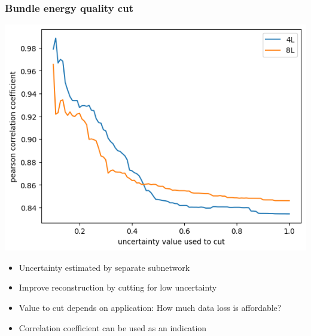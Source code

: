 \documentclass[aspectratio=1610, 9pt]{beamer}
\begin{document}
\begin{frame}
  \frametitle{Bundle energy quality cut}
  \includegraphics[scale=0.4]{Plots/Pearson depending on cut}
  \begin{itemize}
    \item Uncertainty estimated by separate subnetwork
    \item Improve reconstruction by cutting for low uncertainty
    \item Value to cut depends on application: How much data loss is affordable?
    \item Correlation coefficient can be used as an indication
  \end{itemize}
\end{frame}
\end{document}
